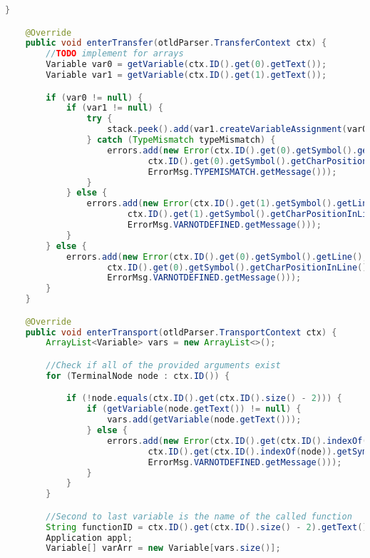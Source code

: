 \begin{landscape}
\begin{lstlisting}[language=Java]
    }

    @Override
    public void enterTransfer(otldParser.TransferContext ctx) {
        //TODO implement for arrays
        Variable var0 = getVariable(ctx.ID().get(0).getText());
        Variable var1 = getVariable(ctx.ID().get(1).getText());

        if (var0 != null) {
            if (var1 != null) {
                try {
                    stack.peek().add(var1.createVariableAssignment(var0));
                } catch (TypeMismatch typeMismatch) {
                    errors.add(new Error(ctx.ID().get(0).getSymbol().getLine(),
                            ctx.ID().get(0).getSymbol().getCharPositionInLine(),
                            ErrorMsg.TYPEMISMATCH.getMessage()));
                }
            } else {
                errors.add(new Error(ctx.ID().get(1).getSymbol().getLine(),
                        ctx.ID().get(1).getSymbol().getCharPositionInLine(),
                        ErrorMsg.VARNOTDEFINED.getMessage()));
            }
        } else {
            errors.add(new Error(ctx.ID().get(0).getSymbol().getLine(),
                    ctx.ID().get(0).getSymbol().getCharPositionInLine(),
                    ErrorMsg.VARNOTDEFINED.getMessage()));
        }
    }

    @Override
    public void enterTransport(otldParser.TransportContext ctx) {
        ArrayList<Variable> vars = new ArrayList<>();

        //Check if all of the provided arguments exist
        for (TerminalNode node : ctx.ID()) {

            if (!node.equals(ctx.ID().get(ctx.ID().size() - 2))) {
                if (getVariable(node.getText()) != null) {
                    vars.add(getVariable(node.getText()));
                } else {
                    errors.add(new Error(ctx.ID().get(ctx.ID().indexOf(node)).getSymbol().getLine(),
                            ctx.ID().get(ctx.ID().indexOf(node)).getSymbol().getCharPositionInLine(),
                            ErrorMsg.VARNOTDEFINED.getMessage()));
                }
            }
        }

        //Second to last variable is the name of the called function
        String functionID = ctx.ID().get(ctx.ID().size() - 2).getText();
        Application appl;
        Variable[] varArr = new Variable[vars.size()];


\end{lstlisting}
\end{landscape}
